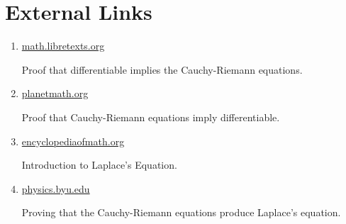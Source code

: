 \documentclass{article}
\begin{document}
    \section*{External Links}
    \def\libretextURL{%
        https://math.libretexts.org/%
            Bookshelves/%
                Analysis/%
                    Complex_Variables_with_Applications_(Orloff)/%
                        02\%3A_Analytic_Functions/%
                            2.06\%3A_Cauchy-Riemann_Equations%
    }
    \def\planetMathURL{%
        https://planetmath.org/ProofOfTheCauchyRiemannEquations%
    }
    \def\encyclopediaURL{%
        https://encyclopediaofmath.org/index.php?title=Laplace_equation%
    }
    \def\byuURL{%
        https://physics.byu.edu/%
            faculty/%
                berrondo/%
                    docs/%
                        physics-441/%
                            laplace.pdf%
    }
    \begin{enumerate}
        \item
            \href{\libretextURL}{math.libretexts.org}
            \par
            Proof that differentiable implies the Cauchy-Riemann equations.
        \item
            \href{\planetMathURL}{planetmath.org}
            \par
            Proof that Cauchy-Riemann equations imply differentiable.
        \item
            \href{\encyclopediaURL}{encyclopediaofmath.org}
            \par
            Introduction to Laplace's Equation.
        \item
            \href{\byuURL}{physics.byu.edu}
            \par
            Proving that the Cauchy-Riemann equations
            produce Laplace's equation.
    \end{enumerate}
\end{document}
